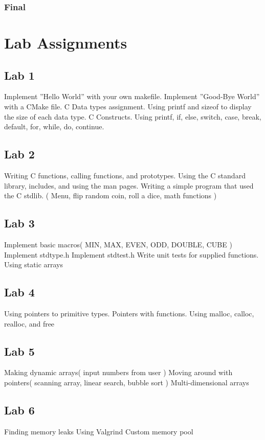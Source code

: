 \documentclass[a4paper,12pt]{report}
\begin{document}
\subsubsection*{Final}

\pagebreak
\section*{Lab Assignments}
\subsection*{Lab 1}
Implement ''Hello World'' with your own makefile.
Implement ''Good-Bye World'' with a CMake file.
C Data types assignment.  Using printf and sizeof to display the size of each data type.
C Constructs.  Using printf, if, else, switch, case, break, default, for, while, do, continue.

\subsection*{Lab 2}
Writing C functions, calling functions, and prototypes.
Using the C standard library, includes, and using the man pages.
Writing a simple program that used the C stdlib. ( Menu, flip random coin, roll a dice, math functions )

\subsection*{Lab 3}
Implement basic macros( MIN, MAX, EVEN, ODD, DOUBLE, CUBE )
Implement stdtype.h
Implement stdtest.h
Write unit tests for supplied functions.
Using static arrays

\subsection*{Lab 4}
Using pointers to primitive types.
Pointers with functions.
Using malloc, calloc, realloc, and free

\subsection*{Lab 5}
Making dynamic arrays( input numbers from user )
Moving around with pointers( scanning array, linear search, bubble sort )
Multi-dimensional arrays

\subsection*{Lab 6}
Finding memory leaks
Using Valgrind
Custom memory pool
\end{document}

